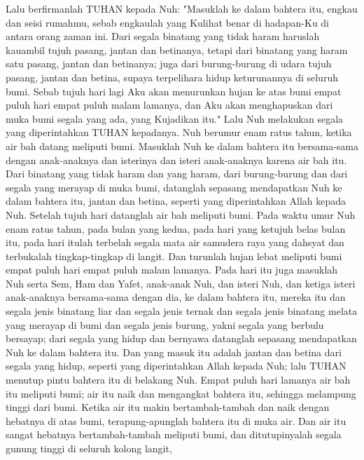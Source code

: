 \begin{biblechapter} %
 Lalu berfirmanlah TUHAN kepada Nuh: "Masuklah ke dalam bahtera itu, engkau dan seisi rumahmu, sebab engkaulah yang Kulihat benar di hadapan-Ku di antara orang zaman ini.
\verse Dari segala binatang yang tidak haram haruslah kauambil tujuh pasang, jantan dan betinanya, tetapi dari binatang yang haram satu pasang, jantan dan betinanya;
\verse juga dari burung-burung di udara tujuh pasang, jantan dan betina, supaya terpelihara hidup keturunannya di seluruh bumi.
\verse Sebab tujuh hari lagi Aku akan menurunkan hujan ke atas bumi empat puluh hari empat puluh malam lamanya, dan Aku akan menghapuskan dari muka bumi segala yang ada, yang Kujadikan itu."
\verse Lalu Nuh melakukan segala yang diperintahkan TUHAN kepadanya.
\verse Nuh berumur enam ratus tahun, ketika air bah datang meliputi bumi.
\verse Masuklah Nuh ke dalam bahtera itu bersama-sama dengan anak-anaknya dan isterinya dan isteri anak-anaknya karena air bah itu.
\verse Dari binatang yang tidak haram dan yang haram, dari burung-burung dan dari segala yang merayap di muka bumi,
\verse datanglah sepasang mendapatkan Nuh ke dalam bahtera itu, jantan dan betina, seperti yang diperintahkan Allah kepada Nuh.
\verse Setelah tujuh hari datanglah air bah meliputi bumi.
\verse Pada waktu umur Nuh enam ratus tahun, pada bulan yang kedua, pada hari yang ketujuh belas bulan itu, pada hari itulah terbelah segala mata air samudera raya yang dahsyat dan terbukalah tingkap-tingkap di langit.
\verse Dan turunlah hujan lebat meliputi bumi empat puluh hari empat puluh malam lamanya.
\verse Pada hari itu juga masuklah Nuh serta Sem, Ham dan Yafet, anak-anak Nuh, dan isteri Nuh, dan ketiga isteri anak-anaknya bersama-sama dengan dia, ke dalam bahtera itu,
\verse mereka itu dan segala jenis binatang liar dan segala jenis ternak dan segala jenis binatang melata yang merayap di bumi dan segala jenis burung, yakni segala yang berbulu bersayap;
\verse dari segala yang hidup dan bernyawa datanglah sepasang mendapatkan Nuh ke dalam bahtera itu.
\verse Dan yang masuk itu adalah jantan dan betina dari segala yang hidup, seperti yang diperintahkan Allah kepada Nuh; lalu TUHAN menutup pintu bahtera itu di belakang Nuh.
\verse Empat puluh hari lamanya air bah itu meliputi bumi; air itu naik dan mengangkat bahtera itu, sehingga melampung tinggi dari bumi.
\verse Ketika air itu makin bertambah-tambah dan naik dengan hebatnya di atas bumi, terapung-apunglah bahtera itu di muka air.
\verse Dan air itu sangat hebatnya bertambah-tambah meliputi bumi, dan ditutupinyalah segala gunung tinggi di seluruh kolong langit,

\end{biblechapter}
